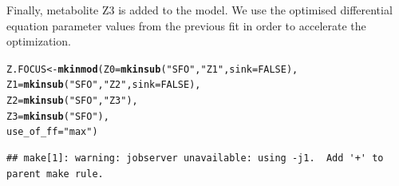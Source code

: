 \documentclass[12pt,a4paper]{article}\usepackage[]{graphicx}\usepackage[]{color}
\makeatletter
\newcommand{\hlnum}[1]{\textcolor[rgb]{0.686,0.059,0.569}{#1}}%
\newcommand{\hlstr}[1]{\textcolor[rgb]{0.192,0.494,0.8}{#1}}%
\newcommand{\hlstd}[1]{\textcolor[rgb]{0.345,0.345,0.345}{#1}}%
\newcommand{\hlkwb}[1]{\textcolor[rgb]{0.69,0.353,0.396}{#1}}%
\newcommand{\hlkwc}[1]{\textcolor[rgb]{0.333,0.667,0.333}{#1}}%
\newcommand{\hlkwd}[1]{\textcolor[rgb]{0.737,0.353,0.396}{\textbf{#1}}}%
\newenvironment{kframe}{%
 \def\at@end@of@kframe{}%
 \ifinner\ifhmode%
  \def\at@end@of@kframe{\end{minipage}}%
  \begin{minipage}{\columnwidth}%
 \fi\fi%
 \def\FrameCommand##1{\hskip\@totalleftmargin \hskip-\fboxsep
 \colorbox{shadecolor}{##1}\hskip-\fboxsep
     \hskip-\linewidth \hskip-\@totalleftmargin \hskip\columnwidth}%
 \MakeFramed {\advance\hsize-\width
   \@totalleftmargin\z@ \linewidth\hsize
   \@setminipage}}%
 {\par\unskip\endMakeFramed%
 \at@end@of@kframe}
\newenvironment{knitrout}{}{} %
\makeatother
\begin{document}
Finally, metabolite Z3 is added to the model. We use the optimised
differential equation parameter values from the previous fit in order to
accelerate the optimization.

\begin{knitrout}
\color{fgcolor}\begin{kframe}
\begin{alltt}
\hlstd{Z.FOCUS} \hlkwb{<-} \hlkwd{mkinmod}\hlstd{(}\hlkwc{Z0} \hlstd{=} \hlkwd{mkinsub}\hlstd{(}\hlstr{"SFO"}\hlstd{,} \hlstr{"Z1"}\hlstd{,} \hlkwc{sink} \hlstd{=} \hlnum{FALSE}\hlstd{),}
                   \hlkwc{Z1} \hlstd{=} \hlkwd{mkinsub}\hlstd{(}\hlstr{"SFO"}\hlstd{,} \hlstr{"Z2"}\hlstd{,} \hlkwc{sink} \hlstd{=} \hlnum{FALSE}\hlstd{),}
                   \hlkwc{Z2} \hlstd{=} \hlkwd{mkinsub}\hlstd{(}\hlstr{"SFO"}\hlstd{,} \hlstr{"Z3"}\hlstd{),}
                   \hlkwc{Z3} \hlstd{=} \hlkwd{mkinsub}\hlstd{(}\hlstr{"SFO"}\hlstd{),}
                   \hlkwc{use_of_ff} \hlstd{=} \hlstr{"max"}\hlstd{)}
\end{alltt}
\begin{verbatim}
## make[1]: warning: jobserver unavailable: using -j1.  Add '+' to parent make rule.
\end{verbatim}



\end{kframe}
\end{knitrout}
\end{document}
